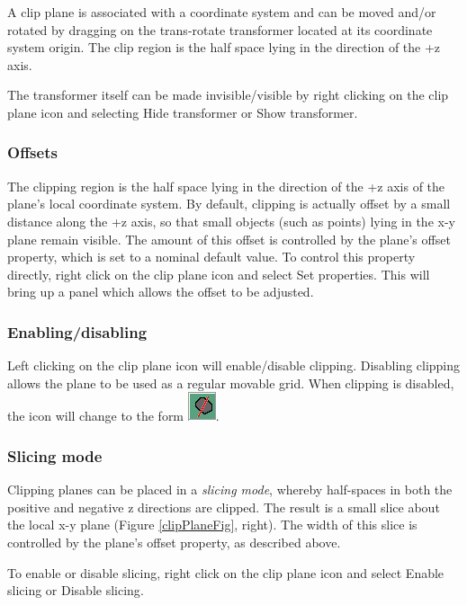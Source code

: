 \documentclass{article}
\begin{document}
A clip plane is associated with a coordinate system and can be moved
and/or rotated by dragging on the trans-rotate transformer located at
its coordinate system origin. The clip region is the half space lying
in the direction of the +z axis.

The transformer itself can be made invisible/visible by right clicking
on the clip plane icon and selecting {\sf Hide transformer} or {\sf Show
transformer}.

\subsubsection{Offsets}

The clipping region is the half space lying in the direction of the +z
axis of the plane's local coordinate system. By default, clipping is
actually offset by a small distance along the +z axis, so that small
objects (such as points) lying in the x-y plane remain
visible. The amount of this offset is controlled by the plane's
{\sf offset} property, which is set to a nominal default value. To control
this property directly, right click on the clip plane icon and select
{\sf Set properties}. This will bring up a panel which allows the offset
to be adjusted.

\subsubsection{Enabling/disabling}

Left clicking on the clip plane icon will enable/disable
clipping. Disabling clipping allows the plane to be used as a regular
movable grid. When clipping is disabled, the icon
will change to the form
\includegraphics[width=.25in]{images/clipPlaneOffIcon}.

\subsubsection{Slicing mode}

Clipping planes can be placed in a {\it slicing mode}, whereby half-spaces
in both the positive and negative z directions are clipped. The result
is a small slice about the local x-y plane (Figure \ref{clipPlaneFig},
right). The width of this slice is controlled by the plane's {\sf offset}
property, as described above.

To enable or disable slicing, right click on the clip plane icon
and select {\sf Enable slicing} or {\sf Disable slicing}.
\end{document}
